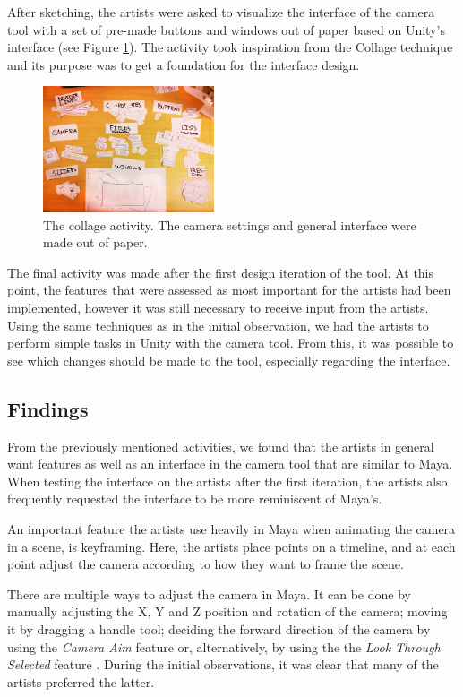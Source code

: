After sketching, the artists were asked to visualize the interface of the camera tool with a set of pre-made buttons and windows out of paper based on Unity's interface (see Figure \ref{fig:collage}). The activity took inspiration from the Collage technique \cite{part_design} and its purpose was to get a foundation for the interface design.

\begin{figure}[htbp]
\centering
\includegraphics[width=0.45\textwidth]{Pics/labels}
\caption{The collage activity. The camera settings and general interface were made out of paper.}
\label{fig:collage}
\end{figure}

The final activity was made after the first design iteration of the tool. At this point, the features that were assessed as most important for the artists had been implemented, however it was still necessary to receive input from the artists. Using the same techniques as in the initial observation, we had the artists to perform simple tasks in Unity with the camera tool. From this, it was possible to see which changes should be made to the tool, especially regarding the interface.

\subsection{Findings}
From the previously mentioned activities, we found that the artists in general want features as well as an interface in the camera tool that are similar to Maya. When testing the interface on the artists after the first iteration, the artists also frequently requested the interface to be more reminiscent of Maya's.

An important feature the artists use heavily in Maya when animating the camera in a scene, is keyframing. Here, the artists place points on a timeline, and at each point adjust the camera according to how they want to frame the scene.

There are multiple ways to adjust the camera in Maya. It can be done by manually adjusting the X, Y and Z position and rotation of the camera; moving it by dragging a handle tool; deciding the forward direction of the camera by using the \textit{Camera Aim} feature \cite{maya_camAim} or, alternatively, by using the the \textit{Look Through Selected} feature \cite{maya_lookThrough}. During the initial observations, it was clear that many of the artists preferred the latter.

